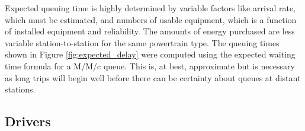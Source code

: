 \documentclass[11pt]{article}
\begin{document}
\begin{multicols}{2}
Expected queuing time is highly determined by variable factors like arrival rate, which must be estimated, and numbers of usable equipment, which is a function of installed equipment and reliability. The amounts of energy purchased are less variable station-to-station for the same powertrain type. The queuing times shown in Figure \ref{fig:expected_delay} were computed using the expected waiting time formula for a M/M/c queue. This is, at best, approximate but is necessary as long trips will begin well before there can be certainty about queues at distant stations.


\subsection*{Drivers}






\printbibliography

\end{multicols}
\end{document}
